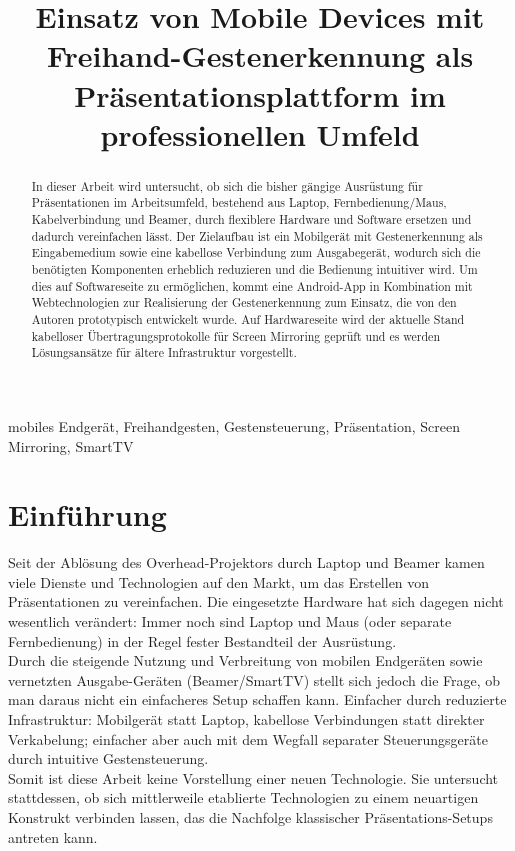 \documentclass{article}
\title{Einsatz von Mobile Devices mit Freihand-Gestenerkennung als Präsentationsplattform im professionellen Umfeld}
\begin{document}
\maketitle

\begin{abstract}
In dieser Arbeit wird untersucht, ob sich die bisher gängige Ausrüstung für Präsentationen im Arbeitsumfeld, bestehend aus Laptop, Fernbedienung/Maus, Kabelverbindung und Beamer, durch flexiblere Hardware und Software ersetzen und dadurch vereinfachen lässt. Der Zielaufbau ist ein Mobilgerät mit Gestenerkennung als Eingabemedium sowie eine kabellose Verbindung zum Ausgabegerät, wodurch sich die benötigten Komponenten erheblich reduzieren und die Bedienung intuitiver wird. Um dies auf Softwareseite zu ermöglichen, kommt eine Android-App in Kombination mit Webtechnologien zur Realisierung der Gestenerkennung zum Einsatz, die von den Autoren prototypisch entwickelt wurde. Auf Hardwareseite wird der aktuelle Stand kabelloser Übertragungsprotokolle für Screen Mirroring geprüft und es werden Lösungsansätze für ältere Infrastruktur vorgestellt. 
\end{abstract}

\begin{keywords}
mobiles Endgerät, Freihandgesten, Gestensteuerung, Präsentation, Screen Mirroring, SmartTV
\end{keywords}

\section{Einführung}
Seit der Ablösung des Overhead-Projektors durch Laptop und Beamer kamen viele Dienste und Technologien auf den Markt, um das Erstellen von Präsentationen zu vereinfachen. 
Die eingesetzte Hardware hat sich dagegen nicht wesentlich verändert: Immer noch sind Laptop und Maus (oder separate Fernbedienung) in der Regel fester Bestandteil der Ausrüstung. \\
Durch die steigende Nutzung und Verbreitung von mobilen Endgeräten sowie vernetzten Ausgabe-Geräten (Beamer/SmartTV) stellt sich jedoch die Frage, ob man daraus nicht ein einfacheres Setup schaffen kann. Einfacher durch reduzierte Infrastruktur: Mobilgerät statt Laptop, kabellose Verbindungen statt direkter Verkabelung; einfacher aber auch mit dem Wegfall separater Steuerungsgeräte durch intuitive Gestensteuerung. \\
Somit ist diese Arbeit keine Vorstellung einer neuen Technologie. Sie untersucht stattdessen, ob sich mittlerweile etablierte Technologien zu einem neuartigen Konstrukt verbinden lassen, das die Nachfolge klassischer Präsentations-Setups antreten kann.
\end{document}
